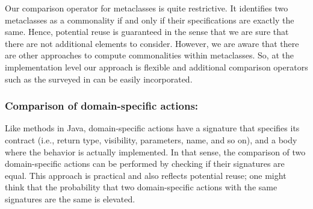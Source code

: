 

Our comparison operator for metaclasses is quite restrictive. It identifies two metaclasses as a commonality if and only if their specifications are exactly the same. Hence, potential reuse is guaranteed in the sense that we are sure that there are not additional elements to consider. However, we are aware that there are other approaches to compute commonalities within metaclasses. So, at the implementation level our approach is flexible and additional comparison operators such as the surveyed in \cite{Lafi:2011} can be easily incorporated.
\vspace{-3mm}
\subsubsection{Comparison of domain-specific actions:} Like methods in Java, domain-specific actions have a signature that specifies its contract (i.e., return type, visibility, parameters, name, and so on), and a body where the behavior is actually implemented. In that sense, the comparison of two domain-specific actions can be performed by checking if their signatures are equal. This approach is practical and also reflects potential reuse; one might think that the probability that two domain-specific actions with the same signatures are the same is elevated.

